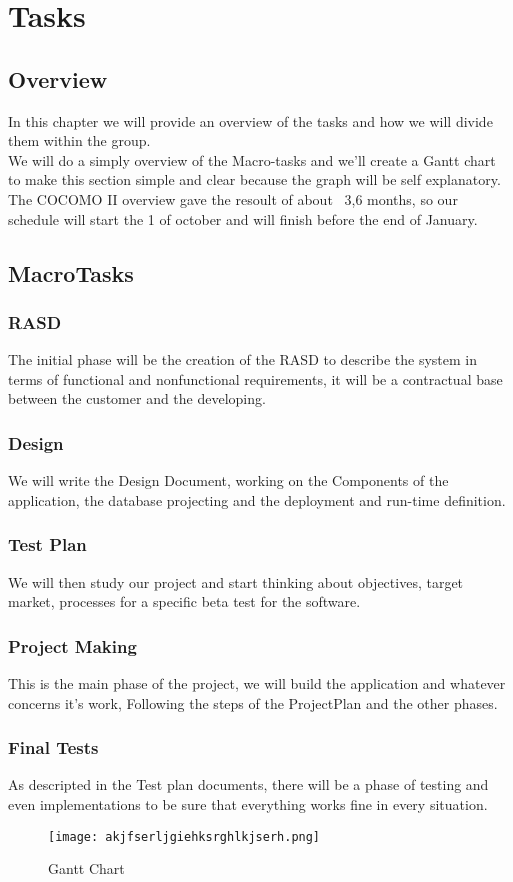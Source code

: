 \section{Tasks}
\subsection{Overview}
In this chapter we will provide an overview of the tasks and how we will divide them within the group. \\
We will do a simply overview of the Macro-tasks and we'll create a Gantt chart to make this section simple and clear because the graph will be self explanatory.\\
The COCOMO II overview gave the resoult of about ~3,6 months, so our schedule will start the 1 of october and will finish before the end of January.
\subsection{MacroTasks}
\subsubsection{RASD}
The initial phase will be the creation of the RASD to describe the system in terms of functional and nonfunctional requirements, it  will be a contractual base between the customer and the developing. 

\subsubsection{Design}
We will write the Design Document, working on the Components of the application, the database projecting and the deployment and run-time definition.

\subsubsection{Test Plan}
We will then study our project and start thinking about objectives, target market, processes for a specific beta test for the software.

\subsubsection{Project Making}
This is the main phase of the project, we will build the application and whatever concerns it's work, Following the steps of the ProjectPlan and the other phases.

\subsubsection{Final Tests}
As descripted in the Test plan documents, there will be a phase of testing and even implementations to be sure that everything works fine in every situation.

\newpage
\begin{landscape}
   \begin{figure}[ht]
    \texttt{[image: akjfserljgiehksrghlkjserh.png]}
    
    \caption{Gantt Chart}
    \label{fig: Gantt Chart}
	\end{figure}

           \end{landscape}
